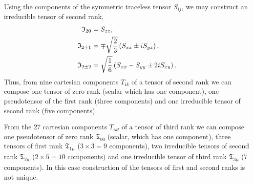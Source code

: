 Using the components of the symmetric traceless tensor $S_{i j}$, we may construct an irreducible tensor of second rank,
\begin{align}
\mathfrak{I}_{20}&=S_{z z}  ,\notag\\
\mathfrak{I}_{2 \pm 1}&=\mp \sqrt{\frac{2}{3}}\left(S_{x z} \pm i S_{y z}\right) , \label{eq:3:2:31}\\
\mathfrak{I}_{2 \pm 2}&=\sqrt{\frac{1}{6}}\left(S_{x x}-S_{y y} \pm 2 i S_{x y}\right). \notag
\end{align}
Thus, from nine cartesian components $T_{i k}$ of a tensor of second rank we can compose one tensor of zero rank (scalar which has one component), one pseudotensor of the first rank (three components) and one irreducible tensor of second rank (five components).

From the 27 cartesian components $T_{i k l}$ of a tensor of third rank we can compose one pseudotensor of zero rank $\mathfrak{T}_{00}$ (scalar, which has one component), three tensors of first rank $\mathfrak{T}_{1 \mu}$ ($3 \times 3=9$ components), two irreducible tensors of second rank $\mathfrak{T}_{2 \mu}$ ($2 \times 5=10$ components)  and one irreducible tensor of third rank $\mathfrak{T}_{3 \mu}$ ($7$ components). In this case construction of the tensors of first and second ranks is not unique.

